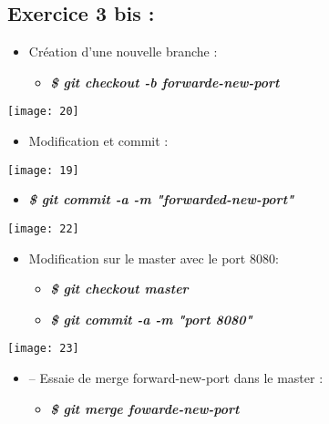 \documentclass[a4paper]{article}
\begin{document}
	\subsection{Exercice 3 bis :}
	\begin{itemize}
		\item Création d'une nouvelle branche :
		\begin{itemize}
			\item \textbf{\textit{\$ git checkout -b forwarde-new-port}}
		\end{itemize}
	\end{itemize}
	\texttt{[image: 20]}
	
	\begin{itemize}
		\item Modification et commit :
	\end{itemize}
	\texttt{[image: 19]}
	

		\begin{itemize}
			\item \textbf{\textit{\$ git commit -a -m  "forwarded-new-port"}}
		\end{itemize}
	\texttt{[image: 22]}
	
	\begin{itemize}
		\item Modification sur le master avec le port 8080:
		\begin{itemize}
			\item \textbf{\textit{\$ git checkout master}}
			\item \textbf{\textit{\$ git commit -a -m "port 8080"}}
		\end{itemize}
	\end{itemize}
	\texttt{[image: 23]}
	
	\begin{itemize}
		\item –	Essaie de merge forward-new-port dans le master :
		\begin{itemize}
			\item \textbf{\textit{\$ git merge fowarde-new-port}}
		\end{itemize}
	\end{itemize}
\end{document}
